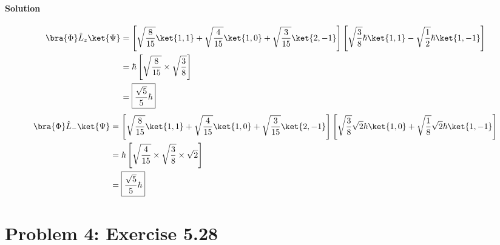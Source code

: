 \documentclass{article}
\begin{document}
\begin{enumerate}
		\paragraph{Solution}
		\begin{equation}
			\begin{aligned}[b]
				\bra{\Phi}\hat{L}_z \ket{\Psi} &= \left[ \sqrt{\frac{8}{15}} \ket{1,1} + \sqrt{\frac{4}{15}} \ket{1,0} + \sqrt{\frac{3}{15}} \ket{2,-1} \right] \left[ \sqrt{\frac{3}{8}} \hbar \ket{1,1} - \sqrt{\frac{1}{2}} \hbar \ket{1,-1} \right] \\
											   &= \hbar \left[ \sqrt{\frac{8}{15}} \times \sqrt{\frac{3}{8}} \right] \\
											   &= \boxed{\frac{\sqrt{5}}{5}\hbar}
			\end{aligned}
		\end{equation}
		\begin{equation}
			\begin{aligned}[b]
				\bra{\Phi}\hat{L}_- \ket{\Psi} &= \left[ \sqrt{\frac{8}{15}} \ket{1,1} + \sqrt{\frac{4}{15}} \ket{1,0} + \sqrt{\frac{3}{15}} \ket{2,-1} \right] \left[ \sqrt{\frac{3}{8}} \sqrt{2}\hbar \ket{1,0} + \sqrt{\frac{1}{8}} \sqrt{2}\hbar \ket{1,-1} \right] \\
											   &= \hbar \left[ \sqrt{\frac{4}{15}} \times \sqrt{\frac{3}{8}} \times \sqrt{2} \right] \\
											   &= \boxed{\frac{\sqrt{5}}{5}\hbar}
			\end{aligned}
		\end{equation}
	\end{enumerate}
	
\clearpage

	\section*{Problem 4: Exercise 5.28}
	
\end{document}
